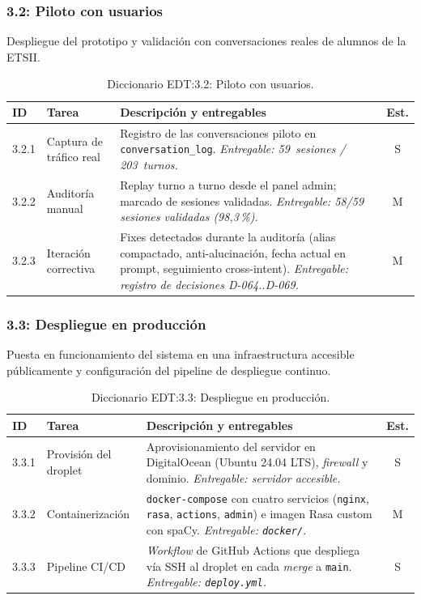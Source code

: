 \subsubsection{3.2: Piloto con usuarios}\label{subsubsec:piloto}

Despliegue del prototipo y validación con conversaciones reales de alumnos de la ETSII.

\begin{table}[hbtp]
\centering
\small
\begin{tabular}{|l|l|p{7.5cm}|c|}
\hline
\textbf{ID} & \textbf{Tarea} & \textbf{Descripción y entregables} & \textbf{Est.} \\ \hline
3.2.1 & Captura de tráfico real & Registro de las conversaciones piloto en \texttt{conversation\_log}. \textit{Entregable: 59~sesiones / 203~turnos.} & S \\ \hline
3.2.2 & Auditoría manual & Replay turno a turno desde el panel admin; marcado de sesiones validadas. \textit{Entregable: 58/59 sesiones validadas (98{,}3\,\%).} & M \\ \hline
3.2.3 & Iteración correctiva & Fixes detectados durante la auditoría (alias compactado, anti-alucinación, fecha actual en prompt, seguimiento cross-intent). \textit{Entregable: registro de decisiones D-064..D-069.} & M \\ \hline
\end{tabular}
\caption{Diccionario EDT:3.2: Piloto con usuarios.}
\label{tab:dict-3-2}
\end{table}

\subsubsection{3.3: Despliegue en producción}\label{subsubsec:despliegue}

Puesta en funcionamiento del sistema en una infraestructura accesible públicamente y configuración del pipeline de despliegue continuo.

\begin{table}[hbtp]
\centering
\small
\begin{tabular}{|l|l|p{7.5cm}|c|}
\hline
\textbf{ID} & \textbf{Tarea} & \textbf{Descripción y entregables} & \textbf{Est.} \\ \hline
3.3.1 & Provisión del droplet & Aprovisionamiento del servidor en DigitalOcean (Ubuntu 24.04 LTS), \textit{firewall} y dominio. \textit{Entregable: servidor accesible.} & S \\ \hline
3.3.2 & Containerización & \texttt{docker-compose} con cuatro servicios (\texttt{nginx}, \texttt{rasa}, \texttt{actions}, \texttt{admin}) e imagen Rasa custom con spaCy. \textit{Entregable: \texttt{docker/}.} & M \\ \hline
3.3.3 & Pipeline CI/CD & \textit{Workflow} de GitHub Actions que despliega vía SSH al droplet en cada \textit{merge} a \texttt{main}. \textit{Entregable: \texttt{deploy.yml}.} & S \\ \hline
\end{tabular}
\caption{Diccionario EDT:3.3: Despliegue en producción.}
\label{tab:dict-3-3}
\end{table}

